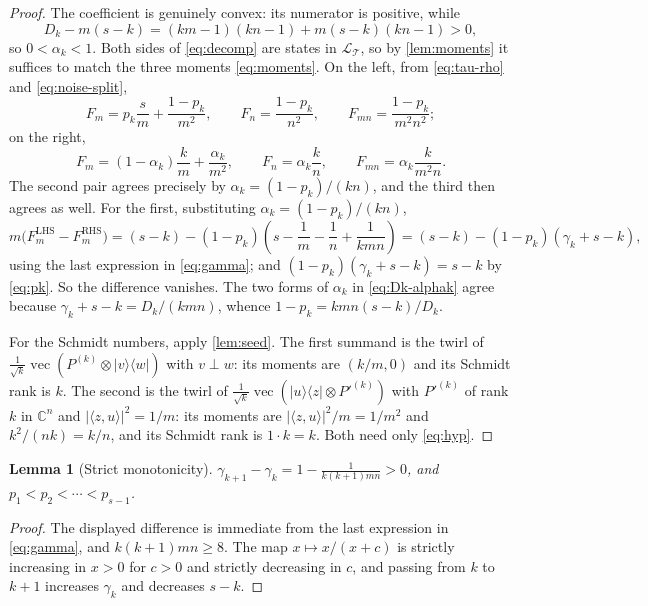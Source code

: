 \documentclass[11pt,reqno]{amsart}
\theoremstyle{plain}
\newtheorem{lemma}[theorem]{Lemma}
\theoremstyle{remark}
\DeclareMathOperator{\vecop}{vec}
\newcommand{\cL}{\mathcal L}
\newcommand{\cT}{\mathcal T}
\newcommand{\ketbra}[2]{\lvert #1\rangle\!\langle #2\rvert}
\newcommand{\ip}[2]{\langle #1,#2\rangle}
\newcommand{\abs}[1]{\lvert #1\rvert}
\newcommand{\C}{\mathbb C}
\begin{document}
\begin{proof}
The coefficient is genuinely convex: its numerator is positive, while
\[
 D_k-m(s-k)
 =(km-1)(kn-1)+m(s-k)(kn-1)>0,
\]
so $0<\alpha_k<1$.
Both sides of \cref{eq:decomp} are states in $\cL_{\cT}$, so by
\cref{lem:moments} it suffices to match the three moments \cref{eq:moments}.
On the left, from \cref{eq:tau-rho} and \cref{eq:noise-split},
\[
    F_m=p_k\frac sm+\frac{1-p_k}{m^2},
    \qquad
    F_n=\frac{1-p_k}{n^2},
    \qquad
    F_{mn}=\frac{1-p_k}{m^2n^2};
\]
on the right,
\[
    F_m=(1-\alpha_k)\frac km+\frac{\alpha_k}{m^2},
    \qquad
    F_n=\alpha_k\frac kn,
    \qquad
    F_{mn}=\alpha_k\frac k{m^2n}.
\]
The second pair agrees precisely by $\alpha_k=(1-p_k)/(kn)$, and the third then
agrees as well.  For the first, substituting $\alpha_k=(1-p_k)/(kn)$,
\[
    m\bigl(F_m^{\mathrm{LHS}}-F_m^{\mathrm{RHS}}\bigr)
    =(s-k)-(1-p_k)\left(s-\frac1m-\frac1n+\frac1{kmn}\right)
    =(s-k)-(1-p_k)(\gamma_k+s-k),
\]
using the last expression in \cref{eq:gamma}; and
$(1-p_k)(\gamma_k+s-k)=s-k$ by \cref{eq:pk}.  So the difference vanishes.  The
two forms of $\alpha_k$ in \cref{eq:Dk-alphak} agree because
$\gamma_k+s-k=D_k/(kmn)$, whence $1-p_k=kmn(s-k)/D_k$.

For the Schmidt numbers, apply \cref{lem:seed}.  The first summand is the twirl
of $\frac1{\sqrt k}\vecop(P^{(k)}\otimes\ketbra vw)$ with $v\perp w$: its
moments are $(k/m,0)$ and its Schmidt rank is $k$.  The second is the twirl of
$\frac1{\sqrt k}\vecop(\ketbra uz\otimes P'^{(k)})$ with $P'^{(k)}$ of rank $k$
in $\C^n$ and $\abs{\ip zu}^2=1/m$: its moments are
$\abs{\ip zu}^2/m=1/m^2$ and $k^2/(nk)=k/n$, and its Schmidt rank is
$1\cdot k=k$.  Both need only \cref{eq:hyp}.
\end{proof}

\begin{lemma}[Strict monotonicity]
\label{lem:mono}
$\gamma_{k+1}-\gamma_k=1-\frac1{k(k+1)mn}>0$, and $p_1<p_2<\cdots<p_{s-1}$.
\end{lemma}

\begin{proof}
The displayed difference is immediate from the last expression in
\cref{eq:gamma}, and $k(k+1)mn\ge8$.  The map $x\mapsto x/(x+c)$ is strictly
increasing in $x>0$ for $c>0$ and strictly decreasing in $c$, and passing from
$k$ to $k+1$ increases $\gamma_k$ and decreases $s-k$.
\end{proof}
\end{document}
